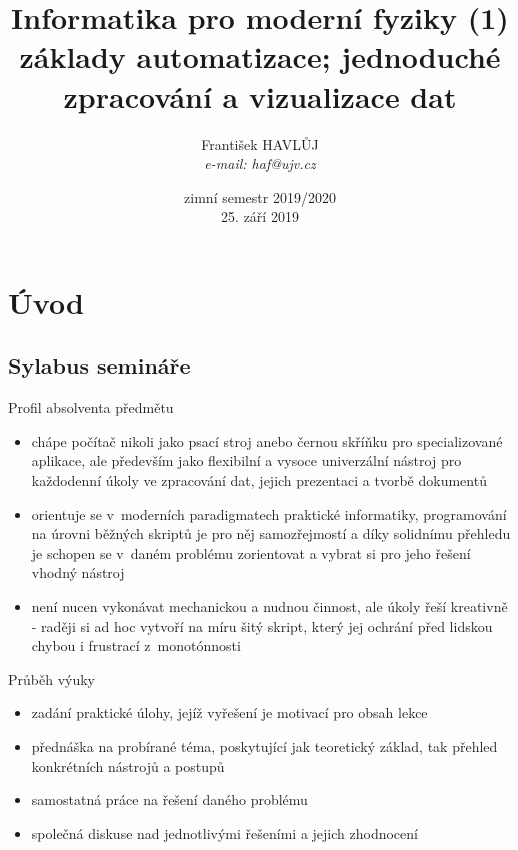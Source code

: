 \documentclass{beamer}
\title[IMF (1)]{Informatika pro moderní fyziky (1)\\základy automatizace; jednoduché zpracování a vizualizace dat}
\author[Franti\v{s}ek HAVL\r{U}J, ORF ÚJV Řež]{Franti\v{s}ek HAVL\r{U}J\\{\scriptsize \emph{e-mail: haf@ujv.cz}}}
\date{zimní semestr 2019/2020\\25. září 2019}
\institute[ORF ÚJV Řež]
{ÚJV Řež\\oddělení Reaktorové fyziky a podpory palivového cyklu}
\begin{document}
\begin{frame}
  \titlepage
\end{frame}

\begin{frame}
  \tableofcontents
\end{frame}

\section{Úvod}

\subsection{Sylabus semináře}

\begin{frame}{Profil absolventa předmětu}
  \begin{itemize}
    \item chápe počítač nikoli jako psací stroj anebo černou skříňku pro specializované aplikace, ale především jako flexibilní a vysoce univerzální nástroj pro každodenní úkoly ve zpracování dat, jejich prezentaci a tvorbě dokumentů
    \item orientuje se v~moderních paradigmatech praktické informatiky, programování na úrovni běžných skriptů je pro něj samozřejmostí a díky solidnímu přehledu je schopen se v~daném problému zorientovat a vybrat si pro jeho řešení vhodný nástroj
    \item není nucen vykonávat mechanickou a nudnou činnost, ale úkoly řeší kreativně - raději si ad hoc vytvoří na míru šitý skript, který jej ochrání před lidskou chybou i frustrací z~monotónnosti
  \end{itemize}
\end{frame}

\begin{frame}{Průběh výuky}
  \begin{itemize}
    \item zadání praktické úlohy, jejíž vyřešení je motivací pro obsah lekce
    \item přednáška na probírané téma, poskytující jak teoretický základ, tak přehled konkrétních nástrojů a postupů
    \item samostatná práce na řešení daného problému
    \item společná diskuse nad jednotlivými řešeními a jejich zhodnocení
  \end{itemize}
\end{frame}
\end{document}
